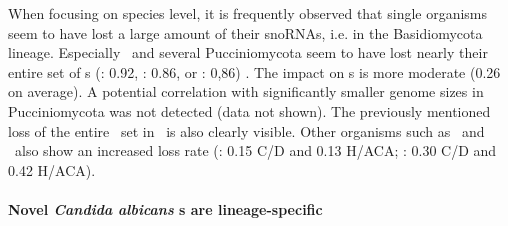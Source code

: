 
When focusing on species level, it is frequently observed that single
organisms seem to have lost a large amount of their snoRNAs, i.e. in the  Basidiomycota lineage. 
Especially \wse\ and several Pucciniomycota seem to have lost nearly their entire set of \haca s (\wse: 0.92, \rmi: 0.86,
or \sli: 0,86) . The impact on \cd s is more moderate (0.26 on
average). A potential correlation with significantly smaller genome
sizes in Pucciniomycota was not detected (data not shown). The
previously mentioned loss of the entire \haca\ set in \Ptt\ is also clearly
visible. Other organisms such
as \pan\ and  \opi\ also show an increased loss rate (\pan: 0.15 C/D
and 0.13 H/ACA; \opi: 0.30 C/D and 0.42 H/ACA). 



\paragraph{\textbf{Novel \emph{Candida albicans} \sno s are lineage-specific}}


